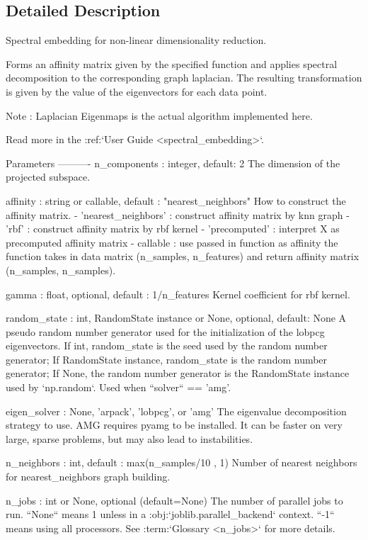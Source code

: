 \subsection{Detailed Description}
\begin{DoxyVerb}Spectral embedding for non-linear dimensionality reduction.

Forms an affinity matrix given by the specified function and
applies spectral decomposition to the corresponding graph laplacian.
The resulting transformation is given by the value of the
eigenvectors for each data point.

Note : Laplacian Eigenmaps is the actual algorithm implemented here.

Read more in the :ref:`User Guide <spectral_embedding>`.

Parameters
----------
n_components : integer, default: 2
    The dimension of the projected subspace.

affinity : string or callable, default : "nearest_neighbors"
    How to construct the affinity matrix.
     - 'nearest_neighbors' : construct affinity matrix by knn graph
     - 'rbf' : construct affinity matrix by rbf kernel
     - 'precomputed' : interpret X as precomputed affinity matrix
     - callable : use passed in function as affinity
       the function takes in data matrix (n_samples, n_features)
       and return affinity matrix (n_samples, n_samples).

gamma : float, optional, default : 1/n_features
    Kernel coefficient for rbf kernel.

random_state : int, RandomState instance or None, optional, default: None
    A pseudo random number generator used for the initialization of the
    lobpcg eigenvectors.  If int, random_state is the seed used by the
    random number generator; If RandomState instance, random_state is the
    random number generator; If None, the random number generator is the
    RandomState instance used by `np.random`. Used when ``solver`` ==
    'amg'.

eigen_solver : {None, 'arpack', 'lobpcg', or 'amg'}
    The eigenvalue decomposition strategy to use. AMG requires pyamg
    to be installed. It can be faster on very large, sparse problems,
    but may also lead to instabilities.

n_neighbors : int, default : max(n_samples/10 , 1)
    Number of nearest neighbors for nearest_neighbors graph building.

n_jobs : int or None, optional (default=None)
    The number of parallel jobs to run.
    ``None`` means 1 unless in a :obj:`joblib.parallel_backend` context.
    ``-1`` means using all processors. See :term:`Glossary <n_jobs>`
    for more details.


\end{DoxyVerb}
